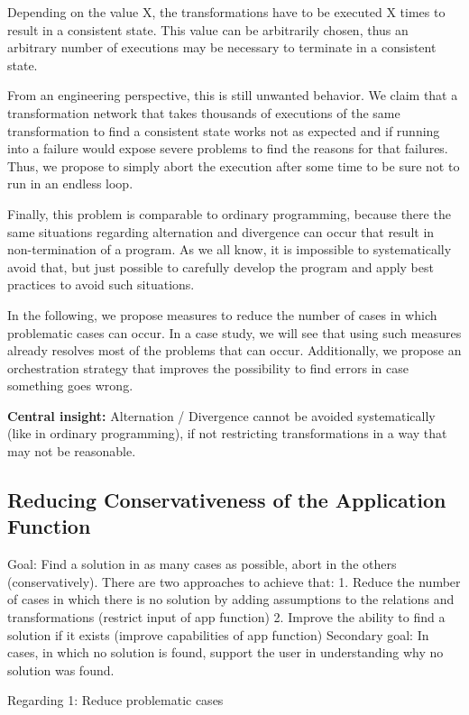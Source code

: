 Depending on the value X, the transformations have to be executed X times to result in a consistent state. This value can be arbitrarily chosen, thus an arbitrary number of executions may be necessary to terminate in a consistent state.

From an engineering perspective, this is still unwanted behavior. We claim that a transformation network that takes thousands of executions of the same transformation to find a consistent state works not as expected and if running into a failure would expose severe problems to find the reasons for that failures.
Thus, we propose to simply abort the execution after some time to be sure not to run in an endless loop.

Finally, this problem is comparable to ordinary programming, because there the same situations regarding alternation and divergence can occur that result in non-termination of a program.
As we all know, it is impossible to systematically avoid that, but just possible to carefully develop the program and apply best practices to avoid such situations.

In the following, we propose measures to reduce the number of cases in which problematic cases can occur.
In a case study, we will see that using such measures already resolves most of the problems that can occur.
Additionally, we propose an orchestration strategy that improves the possibility to find errors in case something goes wrong.

\textbf{Central insight:} Alternation / Divergence cannot be avoided systematically (like in ordinary programming), if not restricting transformations in a way that may not be reasonable.

\subsection{Reducing Conservativeness of the Application Function}

Goal: Find a solution in as many cases as possible, abort in the others (conservatively). There are two approaches to achieve that: 
1. Reduce the number of cases in which there is no solution by adding assumptions to the relations and transformations (restrict input of app function)
2. Improve the ability to find a solution if it exists (improve capabilities of app function)
Secondary goal: In cases, in which no solution is found, support the user in understanding why no solution was found.


Regarding 1: Reduce problematic cases


